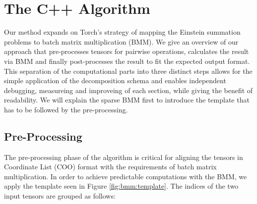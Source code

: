 \section{The C++ Algorithm}
Our method expands on Torch's strategy of mapping the Einstein summation problems to batch matrix
multiplication (BMM). We give an overview of our approach that pre-processes tensors for pairwise
operations, calculates the result via BMM and finally post-processes the result to fit the expected
output format. This separation of the computational parts into three distinct steps allows for the
simple application of the decomposition schema and enables independent debugging, measureing and
improveing of each section, while giving the benefit of readability. We will explain the sparse
BMM first to introduce the template that has to be followed by the pre-processing.

\subsection{Pre-Processing}
The pre-processing phase of the algorithm is critical for aligning the tensors in Coordinate List
(COO) format with the requirements of batch matrix multiplication. In order to achieve predictable
computations with the BMM, we apply the template seen in Figure \ref{fig:bmm:template}. The indices
of the two input tensors are grouped as follows:

